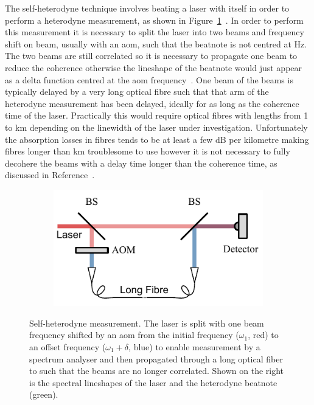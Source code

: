 The self-heterodyne technique involves beating a laser with itself in order to perform a heterodyne measurement, as shown in Figure~\ref{figure:heterodyne_reference}~\cite{okoshi_novel_1980}.
In order to perform this measurement it is necessary to split the laser into two beams and frequency shift on beam, usually with an \gls{aom}, such that the beatnote is not centred at \unit[0]{Hz}.
The two beams are still correlated so it is necessary to propagate one beam to reduce the coherence otherwise the lineshape of the beatnote would just appear as a delta function centred at the \gls{aom} frequency~\cite{richter_linewidth_1986}.
One beam of the beams is typically delayed by a very long optical fibre such that that arm of the heterodyne measurement has been delayed, ideally for as long as the coherence time of the laser.
Practically this would require optical fibres with lengths from 1 to \unit[100]{km} depending on the linewidth of the laser under investigation.
Unfortunately the absorption losses in fibres tends to be at least a few dB per kilometre making fibres longer than \unit[10]{km} troublesome to use however it is not necessary to fully decohere the beams with a delay time longer than the coherence time, as discussed in Reference~\cite{richter_linewidth_1986}.

\begin{figure}
    \begin{subfigure}{0.49\linewidth}
    \includegraphics{part1/Figs/SelfHeterodyne.pdf}
    \end{subfigure}
    \begin{subfigure}{0.49\linewidth}
    
    \end{subfigure}
    \caption{Self-heterodyne measurement. The laser is split with one beam frequency shifted by an \gls{aom} from the initial frequency ($\omega_1$, red) to an offset frequency ($\omega_1+\delta$, blue) to enable measurement by a spectrum analyser and then propagated through a long optical fiber to such that the beams are no longer correlated. Shown on the right is the spectral lineshapes of the laser and the heterodyne beatnote (green).}
    \label{figure:heterodyne_reference}
\end{figure}

